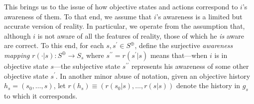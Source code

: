\documentclass[
11pt,
titlepage,
reqno,
]{article}%
\theoremstyle{definition}
\begin{document}
%	
%	
	
This brings us to the issue of how objective states and actions correspond to $i$'s awareness of them.
To that end, we assume that $i$'s awareness is a limited but accurate version of reality.
In particular, we  operate from the assumption that, although $i$ is not aware of all the features of reality,  those of which he \textit{is} aware are correct.  	
To this end, for each $s,s^\prime\in S^\oplus$, define the surjective \textit{awareness mapping} $r(\cdot|s):S^\oplus\rightarrow S_s$ where $s^{\prime\prime}=r(s^\prime|s)$ means that---when $i$ is in objective state $s$---the subjective state $s^{\prime\prime}$  represents his awareness of some other objective state $s^\prime$.
In another minor abuse of notation, given an objective history $h_s=(s_0,\ldots,s)$, let $r(h_s)\equiv(r(s_0|s),\ldots,r(s|s))$ denote the history in $g_s$ to which it corresponds.
\end{document}
